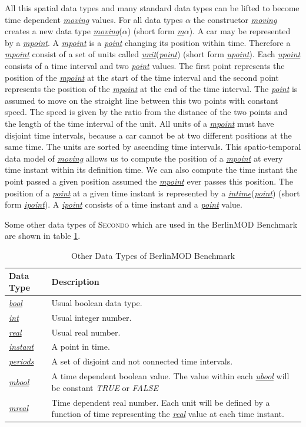 \documentclass[a4paper]{article}
\newcommand{\secondo}{\textsc{Secondo}}
\newcommand{\bmodb} {BerlinMOD Benchmark}
\newcommand{\dt}[1]{\textsl{\underline{#1}}}
\newcommand{\true}{\textsl{TRUE}}
\newcommand{\false}{\textsl{FALSE}}
\begin{document}
All this spatial data types and many standard data types can be lifted to become
time dependent \dt{moving} values. For all data types \dt{$\alpha$} the constructor
\dt{moving} creates a new data type \dt{moving}(\dt{$\alpha$}) (short form \dt{m$\alpha$}).
 A car may be represented by a \dt{mpoint}. A \dt{mpoint} is a \dt{point} changing
its position within time. Therefore a \dt{mpoint} consist of a set of units called
\dt{unit}(\dt{point}) (short form \dt{upoint}). Each \dt{upoint} consists of a time
interval and two \dt{point} values. The first point represents the position of the
\dt{mpoint} at the start of the time interval and the second point represents the
position of the \dt{mpoint} at the end of the time interval. The \dt{point} is
assumed to move on the straight line between this two points with constant speed.
The speed is given by the ratio from the distance of the two points and the length
of the time interval of the unit. All units of a \dt{mpoint} must have disjoint
time intervals, because a car cannot be at two different positions at the same time.
The units are sorted by ascending time intervals. This spatio-temporal data model of \dt{moving} allows us to compute the position of a \dt{mpoint} at every time instant
within its definition time. We can also compute the time instant the point passed a
given position assumed the \dt{mpoint} ever passes this position. The position of a
\dt{point} at a given time instant is represented by a \dt{intime}(\dt{point}) (short form \dt{ipoint}). A \dt{ipoint} consists of a time instant and a \dt{point} value.

Some other data types of \secondo{} which are used in the \bmodb{} are shown in table \ref{tab:bmodbdatatypes}.
\begin{table}[H]
\begin{center}
\begin{scriptsize}
\begin{tabular}{|l|p{9.5cm}|}
\hline
\textbf{Data Type} & \textbf{Description} \\
\hline
\dt{bool} & Usual boolean data type.\\
\hline
\dt{int} & Usual integer number.\\
\hline
\dt{real} & Usual real number.\\
\hline
\dt{instant} & A point in time.\\
\hline
\dt{periods} & A set of disjoint and not connected time intervals.\\
\hline
\dt{mbool} & A time dependent boolean value. The value within each \dt{ubool} will
 be constant \true{} or \false{} \\
\hline
\dt{mreal} & Time dependent real number. Each unit will be defined by a function
of time representing the \dt{real} value at each time instant.\\
\hline
\end{tabular}
\end{scriptsize}
\caption{Other Data Types of \bmodb{}}
\label{tab:bmodbdatatypes}
\end{center}
\end{table}
\end{document}
